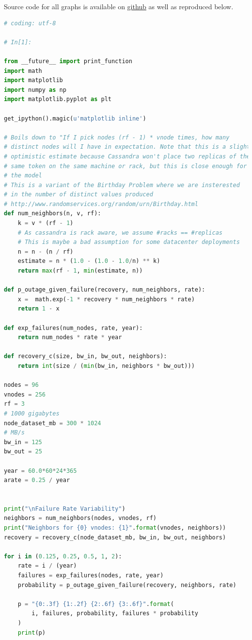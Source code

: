 \documentclass{article}
\begin{document}
Source code for all graphs is available on \href{https://github.com/jolynch/python_performance_toolkit/blob/master/notebooks/cassandra_availability/cassandra_availability.ipynb}{github} as well as reproduced below.
\begin{lstlisting}[language=Python]
# coding: utf-8

# In[1]:

from __future__ import print_function
import math
import matplotlib
import numpy as np
import matplotlib.pyplot as plt

get_ipython().magic(u'matplotlib inline')

# Boils down to "If I pick nodes (rf - 1) * vnode times, how many
# distinct nodes will I have in expectation. Note that this is a slightly
# optimistic estimate because Cassandra won't place two replicas of the
# same token on the same machine or rack, but this is close enough for
# the model
# This is a variant of the Birthday Problem where we are insterested
# in the number of distinct values produced
# http://www.randomservices.org/random/urn/Birthday.html
def num_neighbors(n, v, rf):
    k = v * (rf - 1)
    # As cassandra is rack aware, we assume #racks == #replicas
    # This is maybe a bad assumption for some datacenter deployments
    n = n - (n / rf)
    estimate = n * (1.0 - (1.0 - 1.0/n) ** k)
    return max(rf - 1, min(estimate, n))

def p_outage_given_failure(recovery, num_neighbors, rate):
    x =  math.exp(-1 * recovery * num_neighbors * rate)
    return 1 - x

def exp_failures(num_nodes, rate, year):
    return num_nodes * rate * year

def recovery_c(size, bw_in, bw_out, neighbors):
    return int(size / (min(bw_in, neighbors * bw_out)))

nodes = 96
vnodes = 256
rf = 3
# 1000 gigabytes
node_dataset_mb = 300 * 1024
# MB/s
bw_in = 125
bw_out = 25

year = 60.0*60*24*365
arate = 0.25 / year


print("\nFailure Rate Variability")
neighbors = num_neighbors(nodes, vnodes, rf)
print("Neighbors for {0} vnodes: {1}".format(vnodes, neighbors))
recovery = recovery_c(node_dataset_mb, bw_in, bw_out, neighbors)

for i in (0.125, 0.25, 0.5, 1, 2):
    rate = i / (year)
    failures = exp_failures(nodes, rate, year)
    probability = p_outage_given_failure(recovery, neighbors, rate)

    p = "{0:.3f} {1:.2f} {2:.6f} {3:.6f}".format(
        i, failures, probability, failures * probability
    )
    print(p)



\end{lstlisting}
\end{document}
